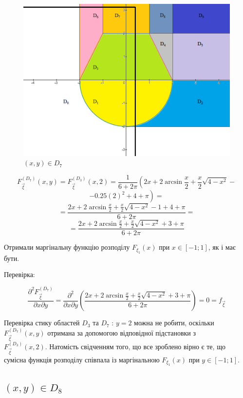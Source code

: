 \documentclass[14pt, a4paper, ukrainian]{extreport}
\begin{document}
	\begin{figure}[H]
		\centering
		\includegraphics[width=\textwidth]{./Image/Im_18_D_7.png}
		\caption{$(x, y) \in D_7$}
		\label{im:D_7}
	\end{figure}
	
	$$ F_{\vec \xi}^{\left(D_7\right)}(x, y) = F_{\vec \xi}^{\left(D_3\right)}(x, 2) = \frac{1}{6+2\pi}\left(2x + 2\arcsin\frac{x}{2} + \frac{x}{2}\sqrt{4-x^2} - \right.
	$$
	$$ \left.- 0.25(2)^2 + 4 + \pi \right) = 
	$$
	$$ = \frac{2x + 2\arcsin\frac{x}{2} + \frac{x}{2}\sqrt{4-x^2} - 1 + 4 + \pi}{6+2\pi} = 
	$$
	$$ = \frac{2x + 2\arcsin\frac{x}{2} + \frac{x}{2}\sqrt{4-x^2} + 3 + \pi}{6+2\pi} 
	$$
	
	Отримали маргінальну функцію розподілу $ F_{\xi_1} (x) $ при $x \in [-1; 1]$, як і має бути.
	
	Перевірка:
	
	$$\frac{\partial^2F_{\vec\xi}^{\left(D_7\right)}}{\partial x \partial y} = \frac{\partial^2}{\partial x \partial y} \left(\frac{2x + 2\arcsin\frac{x}{2} + \frac{x}{2}\sqrt{4-x^2} + 3 + \pi}{6+2\pi} \right) = 0 = f_{\vec\xi}
	$$
	
	Перевірка стику областей $D_3$ та $D_7$ : $ y = 2$ можна не робити, оскільки $F_{\vec \xi}^{\left(D_7\right)}(x, y)$ отримана за допомогою відповідної підстановки з \\
	$F_{\vec \xi}^{\left(D_3\right)}(x, 2)$. Натомість свідченням того, що все зроблено вірно є те, що сумісна функція розподілу співпала із маргінальною $ F_{\xi_1} (x) $ при $y \in [-1; 1]$.
		
	
	\subsection{$(x, y) \in D_8$}
	
\end{document}
